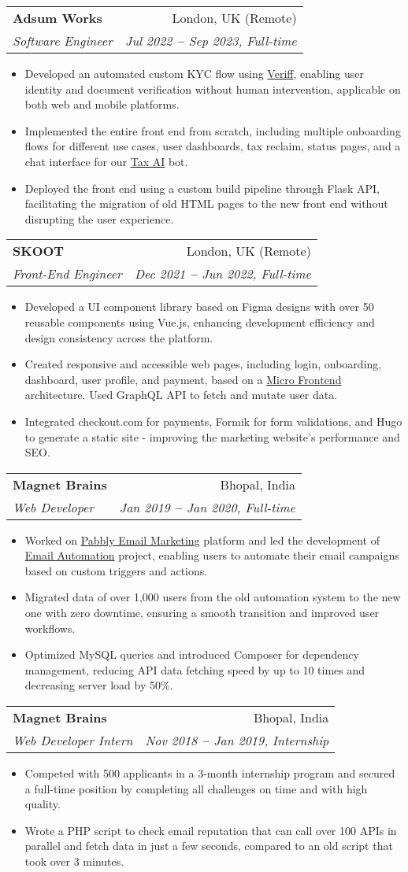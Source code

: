 \documentclass[letterpaper,12pt]{article}
\makeatletter
\newcommand{\resumeItem}[1]{
  \item\small{
    {#1 \vspace{-2pt}}
  }
}
\newcommand{\resumeSubheading}[4]{
  \vspace{-2pt}\item
    \begin{tabular*}{0.97\textwidth}[t]{l@{\extracolsep{\fill}}r}
      \textbf{#1} & #2 \\
      \textit{\small#3} & \textit{\small #4} \\
    \end{tabular*}\vspace{-7pt}
}
\newcommand{\resumeItemListStart}{\begin{itemize}}
\newcommand{\resumeItemListEnd}{\end{itemize}\vspace{-5pt}}
\def\myHometown{Bhopal, India}
\makeatother
\begin{document}
\resumeSubheading
{Adsum Works}{London, UK (Remote)}
{Software Engineer}{Jul 2022 \textbf{--} Sep 2023, Full-time}
\resumeItemListStart
\resumeItem{Developed an automated custom KYC flow using \href{https://veriff.com}{\color{blue}Veriff}, enabling user identity and document verification without human intervention, applicable on both web and mobile platforms.}
\resumeItem{Implemented the entire front end from scratch, including multiple onboarding flows for different use cases, user dashboards, tax reclaim, status pages, and a chat interface for our \href{https://chat.taxai.uk}{\color{blue}Tax AI} bot.}
\resumeItem{Deployed the front end using a custom build pipeline through Flask API, facilitating the migration of old HTML pages to the new front end without disrupting the user experience.}
\resumeItemListEnd

\resumeSubheading
{SKOOT}{London, UK (Remote)}
{Front-End Engineer}{Dec 2021 \textbf{--} Jun 2022, Full-time}
\resumeItemListStart
\resumeItem{Developed a UI component library based on Figma designs with over 50 reusable components using Vue.js, enhancing development efficiency and design consistency across the platform.}
\resumeItem{Created responsive and accessible web pages, including login, onboarding, dashboard, user profile, and payment, based on a \href{https://chat.taxai.uk}{\color{blue}Micro Frontend} architecture. Used GraphQL API to fetch and mutate user data.}
\resumeItem{Integrated checkout.com for payments, Formik for form validations, and Hugo to generate a static site - improving the marketing website's performance and SEO.}
\resumeItemListEnd

\resumeSubheading
{Magnet Brains}{\myHometown}
{Web Developer}{Jan 2019 \textbf{--} Jan 2020, Full-time}
\resumeItemListStart
\resumeItem{Worked on \href{https://www.pabbly.com/email-marketing}{\color{blue}Pabbly Email Marketing} platform and led the development of \href{https://youtube.com/watch?v=kkopsVYOO7Y}{\color{blue}Email Automation} project, enabling users to automate their email campaigns based on custom triggers and actions.}
\resumeItem{Migrated data of over 1,000 users from the old automation system to the new one with zero downtime, ensuring a smooth transition and improved user workflows.}
\resumeItem{Optimized MySQL queries and introduced Composer for dependency management, reducing API data fetching speed by up to 10 times and decreasing server load by 50\%.}
\resumeItemListEnd

\resumeSubheading
{Magnet Brains}{\myHometown}
{Web Developer Intern}{Nov 2018 \textbf{--} Jan 2019, Internship}
\resumeItemListStart
\resumeItem{Competed with 500 applicants in a 3-month internship program and secured a full-time position by completing all challenges on time and with high quality.}
\resumeItem{Wrote a PHP script to check email reputation that can call over 100 APIs in parallel and fetch data in just a few seconds, compared to an old script that took over 3 minutes.}
\resumeItemListEnd
\end{document}
